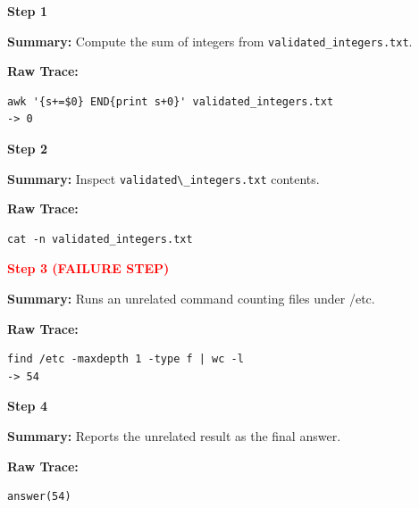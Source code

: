 \documentclass[11pt]{article}
\begin{document}
\begin{tcolorbox}[
breakable,
colback=customwhite,
colframe=customyellow,
title=Planning Error,
fontupper=\fontfamily{pcr}\selectfont\scriptsize
]

\textbf{Step 1}

\textbf{Summary:}  
Compute the sum of integers from \verb|validated_integers.txt|.

\textbf{Raw Trace:}
\begin{verbatim}
awk '{s+=$0} END{print s+0}' validated_integers.txt
-> 0
\end{verbatim}

\medskip
\textbf{Step 2}

\textbf{Summary:}  
Inspect \verb|validated\_integers.txt| contents.

\textbf{Raw Trace:}
\begin{verbatim}
cat -n validated_integers.txt
\end{verbatim}

\medskip
\textbf{\textcolor{red}{Step 3 (FAILURE STEP)}}

\textbf{Summary:}  
Runs an unrelated command counting files under /etc.

\textbf{Raw Trace:}
\begin{verbatim}
find /etc -maxdepth 1 -type f | wc -l
-> 54
\end{verbatim}

\medskip
\textbf{Step 4}

\textbf{Summary:}  
Reports the unrelated result as the final answer.

\textbf{Raw Trace:}
\begin{verbatim}
answer(54)
\end{verbatim}

\end{tcolorbox}




\clearpage
\end{document}
